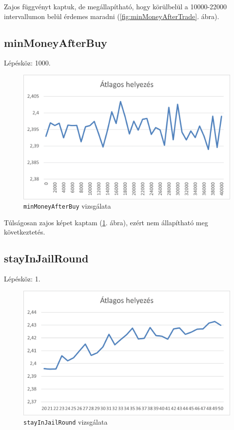 Zajos függvényt kaptuk, de megállapítható, hogy körülbelül a 10000-22000 intervallumon belül érdemes maradni (\ref{fig:minMoneyAfterTrade}. ábra).

\subsection{minMoneyAfterBuy}

Lépésköz: 1000.

\begin{figure}[h!]
\centering
\includegraphics[scale=0.2]{images/fdgd.png}
\caption{\texttt{minMoneyAfterBuy} vizsgálata}
\label{fig:minMoneyAfterBuy}
\end{figure}

Túlságosan zajos képet kaptam (\ref{fig:minMoneyAfterBuy}. ábra), ezért nem állapítható meg következtetés.

\subsection{stayInJailRound}

Lépésköz: 1.

\begin{figure}[h!]
\centering
\includegraphics[scale=0.2]{images/dfg.png}
\caption{\texttt{stayInJailRound} vizsgálata}
\label{fig:stayInJailRound}
\end{figure}

